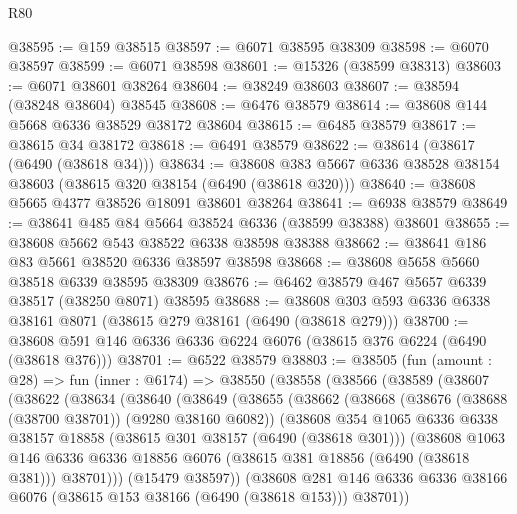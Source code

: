 \begin{lexlean}{R80}
\begin{coremodule}
@38595 := @159 @38515
@38597 := @6071 @38595 @38309
@38598 := @6070 @38597
@38599 := @6071 @38598
@38601 := @15326 (@38599 @38313)
@38603 := @6071 @38601 @38264
@38604 := @38249 @38603
@38607 := @38594 (@38248 @38604) @38545
@38608 := @6476 @38579
@38614 := @38608 @144 @5668 @6336 @38529 @38172 @38604
@38615 := @6485 @38579
@38617 := @38615 @34 @38172
@38618 := @6491 @38579
@38622 := @38614 (@38617 (@6490 (@38618 @34)))
@38634 := @38608 @383 @5667 @6336 @38528 @38154 @38603 (@38615 @320 @38154 (@6490 (@38618 @320)))
@38640 := @38608 @5665 @4377 @38526 @18091 @38601 @38264
@38641 := @6938 @38579
@38649 := @38641 @485 @84 @5664 @38524 @6336 (@38599 @38388) @38601
@38655 := @38608 @5662 @543 @38522 @6338 @38598 @38388
@38662 := @38641 @186 @83 @5661 @38520 @6336 @38597 @38598
@38668 := @38608 @5658 @5660 @38518 @6339 @38595 @38309
@38676 := @6462 @38579 @467 @5657 @6339 @38517 (@38250 @8071) @38595
@38688 := @38608 @303 @593 @6336 @6338 @38161 @8071 (@38615 @279 @38161 (@6490 (@38618 @279)))
@38700 := @38608 @591 @146 @6336 @6336 @6224 @6076 (@38615 @376 @6224 (@6490 (@38618 @376)))
@38701 := @6522 @38579
@38803 := @38505
    (fun (amount : @28) =>
    fun (inner : @6174) =>
    @38550
      (@38558
        (@38566
          (@38589
            (@38607
              (@38622
                (@38634
                  (@38640
                    (@38649
                      (@38655
                        (@38662
                          (@38668
                            (@38676 (@38688 (@38700 @38701)) (@9280 @38160 @6082))
                            (@38608
                              @354
                              @1065
                              @6336
                              @6338
                              @38157
                              @18858
                              (@38615 @301 @38157 (@6490 (@38618 @301)))
                              (@38608
                                @1063
                                @146
                                @6336
                                @6336
                                @18856
                                @6076
                                (@38615 @381 @18856 (@6490 (@38618 @381)))
                                @38701)))
                          (@15479 @38597))
                        (@38608
                          @281
                          @146
                          @6336
                          @6336
                          @38166
                          @6076
                          (@38615 @153 @38166 (@6490 (@38618 @153)))
                          @38701))

\end{coremodule}
\end{lexlean}
